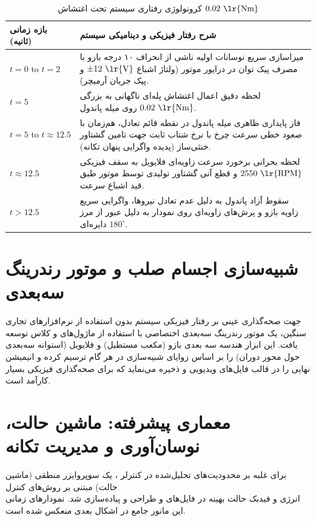 \documentclass[12pt]{report}
\begin{document}
\begin{table}[h!]
	\centering
	\caption{کرونولوژی رفتاری سیستم تحت اغتشاش $0.02 \text{ \lr{Nm}}$}
	\label{tab:timeline}
	\begin{tabular}{|p{3cm}|p{11cm}|}
		\hline
		\textbf{بازه زمانی (ثانیه)} & \textbf{شرح رفتار فیزیکی و دینامیکی سیستم} \\ \hline
		$t = 0 \text{ to } t = 2$ & میراسازی سریع نوسانات اولیه ناشی از انحراف ۱۰ درجه بازو با مصرف پیک توان در درایور موتور (ولتاژ اشباع $\pm 12 \text{ \lr{V}}$ و پیک جریان آرمیچر). \\ \hline
		$t = 5$ & لحظه دقیق اعمال اغتشاش پله‌ای ناگهانی به بزرگی $0.02 \text{ \lr{Nm}}$ روی میله پاندول. \\ \hline
		$t = 5 \text{ to } t \approx 12.5$ & فاز پایداری ظاهری میله پاندول در نقطه قائم تعادل، هم‌زمان با صعود خطی سرعت چرخ با نرخ شتاب ثابت جهت تامین گشتاور خنثی‌ساز (پدیده واگرایی پنهان تکانه). \\ \hline
		$t \approx 12.5$ & لحظه بحرانی برخورد سرعت زاویه‌ای فلایویل به سقف فیزیکی $2550 \text{ \lr{RPM}}$ و قطع آنی گشتاور تولیدی توسط موتور طبق قید اشباع سرعت. \\ \hline
		$t > 12.5$ & سقوط آزاد پاندول به دلیل عدم تعادل نیروها، واگرایی سریع زاویه بازو و پرش‌های زاویه‌ای روی نمودار به دلیل عبور از مرز دایره‌ای $180^\circ$. \\ \hline
	\end{tabular}
\end{table}

\section{شبیه‌سازی اجسام صلب و موتور رندرینگ سه‌بعدی}
جهت صحه‌گذاری عینی بر رفتار فیزیکی سیستم بدون استفاده از نرم‌افزارهای تجاری سنگین، یک موتور رندرینگ سه‌بعدی اختصاصی با استفاده از ماژول‌های  و کلاس  توسعه یافت. این ابزار هندسه سه بعدی بازو (مکعب مستطیل) و فلایویل (استوانه سه‌بعدی حول محور دوران) را بر اساس زوایای شبیه‌سازی در هر گام ترسیم کرده و انیمیشن نهایی را در قالب فایل‌های ویدیویی  و  ذخیره می‌نماید که برای صحه‌گذاری فیزیکی بسیار کارآمد است.

\section{معماری پیشرفته: ماشین حالت، نوسان‌آوری و مدیریت تکانه}
برای غلبه بر محدودیت‌های تحلیل‌شده در کنترلر ، یک سوپروایزر منطقی (ماشین حالت) مبتنی بر روش‌های کنترل \\
انرژی و فیدبک حالت بهینه در فایل‌های  و  طراحی و پیاده‌سازی شد. نمودارهای زمانی این مانور جامع در اشکال بعدی منعکس شده است.
\end{document}

